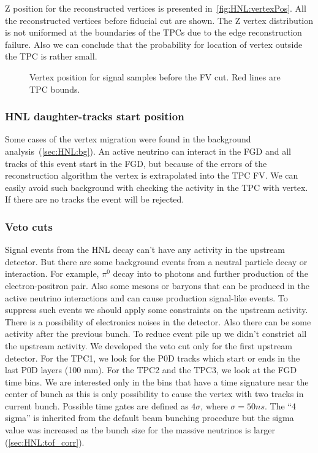 \documentclass[../main.tex]{subfiles}
\begin{document}
Z position for the reconstructed vertices is presented in~\autoref{fig:HNL:vertexPos}. All the reconstructed vertices before fiducial cut are shown. The Z vertex distribution is not uniformed at the boundaries of the TPCs due to the edge reconstruction failure. Also we can conclude that the probability for location of vertex outside the TPC is rather small.
\begin{figure}[!ht]
  \caption{Vertex position for signal samples before the FV cut. Red lines are TPC bounds.}
  \label{fig:HNL:vertexPos}
\end{figure}

\subsubsection{HNL daughter-tracks start position}
Some cases of the vertex migration were found in the background analysis~(\autoref{sec:HNL:bg}). An active neutrino can interact in the FGD and all tracks of this event start in the FGD, but because of the errors of the reconstruction algorithm the vertex is extrapolated into the TPC FV. We can easily avoid such background with checking the activity in the TPC with vertex. If there are no tracks the event will be rejected.

\subsubsection{Veto cuts}
Signal events from the HNL decay can't have any activity in the upstream detector. But there are some background events from a neutral particle decay or interaction. For example, $\pi^0$ decay into to photons and further production of the electron-positron pair. Also some mesons or baryons that can be produced in the active neutrino interactions and can cause production signal-like events. To suppress such events we should apply some constraints on the upstream activity. There is a possibility of electronics noises in the detector. Also there can be some activity after the previous bunch. To reduce event pile up we didn't constrict all the upstream activity. We developed the veto cut only for the first upstream detector. For the TPC1, we look for the P0D tracks which start or ends in the last P0D layers (100 mm). For the TPC2 and the  TPC3, we look at the FGD time bins. We are interested only in the bins that have a time signature near the center of bunch as this is only possibility to cause the vertex with two tracks in current bunch. Possible time gates are defined as $4\sigma$, where $\sigma=50ns$. The ``4 sigma'' is inherited from the default beam bunching procedure but the sigma value was increased as the bunch size for the massive neutrinos is larger (\autoref{sec:HNL:tof_corr}).
\end{document}
